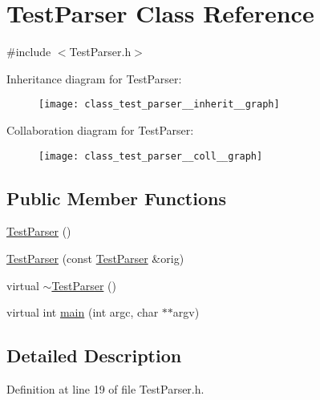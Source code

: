 \hypertarget{class_test_parser}{\section{Test\-Parser Class Reference}
\label{class_test_parser}
}


{\ttfamily \#include $<$Test\-Parser.\-h$>$}



Inheritance diagram for Test\-Parser\-:\nopagebreak
\begin{figure}[H]
\begin{center}
\leavevmode
\texttt{[image: class\_test\_parser\_\_inherit\_\_graph]}
\end{center}
\end{figure}


Collaboration diagram for Test\-Parser\-:\nopagebreak
\begin{figure}[H]
\begin{center}
\leavevmode
\texttt{[image: class\_test\_parser\_\_coll\_\_graph]}
\end{center}
\end{figure}
\subsection*{Public Member Functions}
\begin{DoxyCompactItemize}
\item 
\hyperlink{class_test_parser_a3056c42aee6e9d0a64dabb003ca305b5}{Test\-Parser} ()
\item 
\hyperlink{class_test_parser_a6405f855bb9ef1b4db53de578fb46ea0}{Test\-Parser} (const \hyperlink{class_test_parser}{Test\-Parser} \&orig)
\item 
virtual \hyperlink{class_test_parser_a17368a4484872afc8e4c13ca98d0932e}{$\sim$\-Test\-Parser} ()
\item 
virtual int \hyperlink{class_test_parser_ae1421b04c5b7420e8d542ebefe46f70e}{main} (int argc, char $\ast$$\ast$argv)
\end{DoxyCompactItemize}


\subsection{Detailed Description}


Definition at line 19 of file Test\-Parser.\-h.



